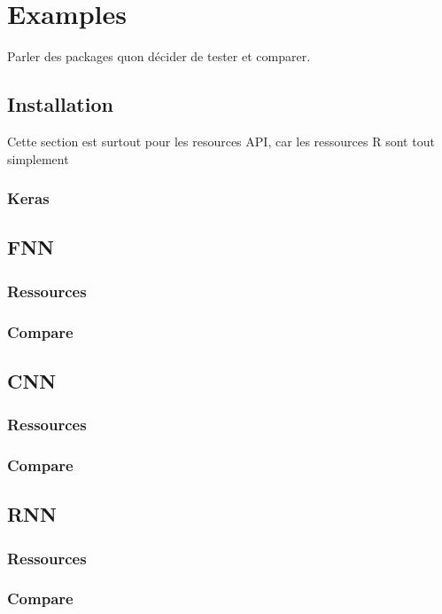 \documentclass[6pt,letter]{article}\usepackage[]{graphicx}\usepackage[]{color}
\begin{document}
\section{Examples}
\label{sec:examples}
Parler des packages quon décider de tester et comparer.
\subsection{Installation}
Cette section est surtout pour les resources API, car les ressources R sont tout simplement
\subsubsection{Keras}

\subsection{\ac{FNN}}
\subsubsection{Ressources}

\subsubsection{Compare}

\subsection{\ac{CNN}}
\subsubsection{Ressources}
\subsubsection{Compare}

\subsection{\ac{RNN}}
\subsubsection{Ressources}
\subsubsection{Compare}


\FloatBarrier 
\clearpage 
\pagestyle{plain}

\printbibliography
\end{document}
